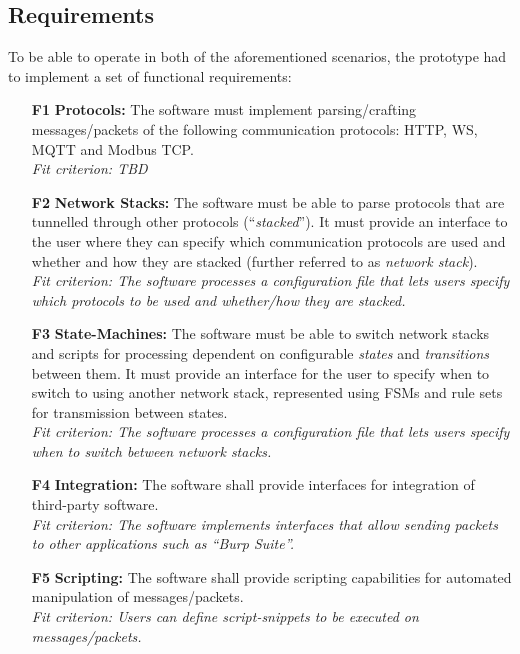 

\subsection{Requirements}
To be able to operate in both of the aforementioned scenarios, the prototype had to implement a set of functional requirements:
\begin{itemize}
    \item [\textbf{F1}] \textbf{Protocols:} The software must implement parsing/crafting messages/packets of the following communication protocols: \ac{HTTP}, \ac{WS}, \ac{MQTT} and Modbus \ac{TCP}. \\
          \textit{Fit criterion: TBD} %
    \item [\textbf{F2}] \textbf{Network Stacks:} The software must be able to parse protocols that are tunnelled through other protocols (\enquote{\emph{stacked}}). It must provide an interface to the user where they can specify which communication protocols are used and whether and how they are stacked (further referred to as \emph{network stack}).\\
          \textit{Fit criterion: The software processes a configuration file that lets users specify which protocols to be used and whether/how they are stacked.}
    \item [\textbf{F3}] \textbf{State-Machines:} The software must be able to switch network stacks and scripts for processing dependent on configurable \emph{states} and \emph{transitions} between them. It must provide an interface for the user to specify when to switch to using another network stack, represented using \acp{FSM} and rule sets for transmission between states.\\
          \textit{Fit criterion: The software processes a configuration file that lets users specify when to switch between network stacks.}
    \item [\textbf{F4}] \textbf{Integration:} The software shall provide interfaces for integration of third-party software.\\
          \textit{Fit criterion: The software implements interfaces that allow sending packets to other applications such as \enquote{Burp Suite}.}
    \item [\textbf{F5}] \textbf{Scripting:} The software shall provide scripting capabilities for automated manipulation of messages/packets.\\
          \textit{Fit criterion: Users can define script-snippets to be executed on messages/packets.}
\end{itemize}

